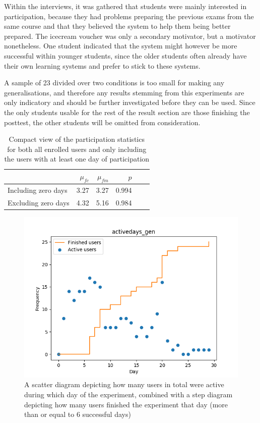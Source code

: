 Within the interviews, it was gathered that students were mainly interested in participation, because they had problems preparing the previous exams from the same course and that they believed the system to help them being better prepared. The icecream voucher was only a secondary motivator, but a motivator nonetheless. One student indicated that the system might however be more successful within younger students, since the older students often already have their own learning systems and prefer to stick to these systems.

A sample of 23 divided over two conditions is too small for making any generalisations, and therefore any results stemming from this experiments are only indicatory and should be further investigated before they can be used. Since the only students usable for the rest of the result section are those finishing the posttest, the other students will be omitted from consideration.

\begin{table}
    \centering
    \begin{tabular}{lrrrrr}
        \toprule
        & $\mu_{fc}$ & $\mu_{fm}$ & $p$ \\
        \midrule
        Including zero days & 3.27 & 3.27 & 0.994 \\
        Excluding zero days & 4.32 & 5.16 & 0.984 \\
        \bottomrule
    \end{tabular}
    \caption{Compact view of the participation statistics for both all enrolled users and only including the users with at least one day of participation}
    \label{tab:participation}
\end{table}

\begin{figure}
    \centering
    \includegraphics[width=.7\textwidth]{img/activedays_gen.png}
    \caption{A scatter diagram depicting how many users in total were active during which day of the experiment, combined with a step diagram depicting how many users finished the experiment that day (more than or equal to 6 successful days)}
    \label{fig:activedays_gen}
\end{figure}

